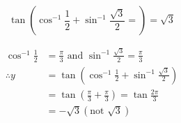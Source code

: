 \documentclass[14pt,fleqn]{extarticle}
\newcommand\anga{\cos^{-1}\frac{1}{2}}
\newcommand\angb{\sin^{-1}\frac{\sqrt{3}}{2}}
\begin{document}
 
\begin{snippet}
    
    \incorrect
    
    \[ \tan \left(\anga + \angb= \right) = \sqrt{3} \]
    
    \reason
    
    \begin{align}
	\anga &= \frac\pi{3} \text{ and } \angb = \frac\pi{3} \\
	\therefore y &= \tan \left(\anga + \angb \right) \\
	&= \tan \left(\frac\pi{3} + \frac\pi{3} \right) = \tan\frac{2\pi}{3} \\
	&= -\sqrt{3} \left(\text{not }\sqrt{3}  \right)
\end{align}
    
\end{snippet} 
\end{document}
